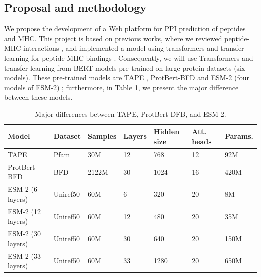 \documentclass[a4paper,11pt]{article}
\begin{document}
\subsection{Proposal and methodology}

We propose the development of a Web platform for PPI prediction of peptides and MHC. This project is based on previous works, where we reviewed peptide-MHC interactions \cite{machaca2023deep}, and implemented a model using transformers and transfer learning for peptide-MHC bindings \cite{arceda2023neoantigen}. Consequently, we will use Transformers and transfer learning from  BERT models pre-trained on large protein datasets (six models). These pre-trained models are TAPE \cite{rao2019evaluating}, ProtBert-BFD \cite{elnaggar2021prottrans}  and ESM-2 \cite{lin2023evolutionary} (four models of ESM-2) ; furthermore, in Table \ref{tab:pretrained}, we present the major difference between these models.

\begin{table}[h]%
	\centering
	\caption{Major differences between TAPE, ProtBert-DFB, and ESM-2.\label{tab:pretrained}}%
	\begin{tabular}{lllllll}
		
		\textbf{Model}   & \textbf{Dataset} & \textbf{Samples} & \textbf{Layers} & \textbf{Hidden size} & \textbf{Att. heads} & \textbf{Params.} \\
		\midrule
		TAPE             & Pfam             & 30M                   & 12              & 768                  & 12                       & 92M                 \\
		ProtBert-BFD     & BFD              & 2122M                 & 30              & 1024                 & 16                       & 420M                \\
		ESM-2 (6 layers)  & Uniref50         & 60M                   & 6               & 320                  & 20                       & 8M                  \\
		ESM-2 (12 layers)  & Uniref50         & 60M                   & 12              & 480                  & 20                       & 35M                 \\
		ESM-2 (30 layers) & Uniref50         & 60M                   & 30              & 640                  & 20                       & 150M                \\
		ESM-2 (33 layers)  & Uniref50         & 60M                   & 33              & 1280                 & 20                       & 650M               \\
	
	\end{tabular}
	
\end{table}
\end{document}
